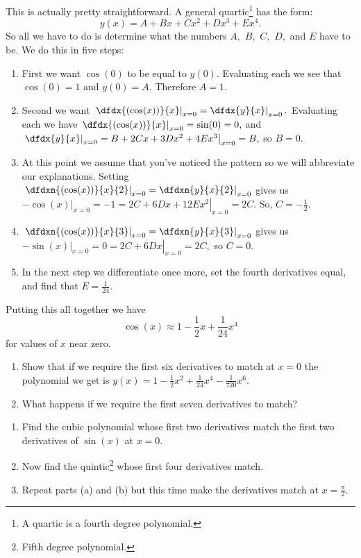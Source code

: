 \begin{Digression}
\begin{myexample}
  This is actually pretty straightforward. A general
  quartic\footnote{A quartic is a fourth degree polynomial.} has the
  form:
$$
y(x) = A+Bx+Cx^2+Dx^3+Ex^4.
$$
So all we have to do is determine what the numbers $A,$ $B,$ $C,$ $D,$
and $E$ have to be. We do this in five steps:
\begin{enumerate}
\item First we want $\cos(0)$ to be equal to $y(0).$ Evaluating each
  we see that $\cos(0)=1$ and $y(0)=A.$ Therefore $A=1.$
\item Second we want
  $\left.\left.\dfdx{(\cos(x))}{x}\right|_{x=0}=\dfdx{y}{x}\right|_{x=0}.$
  Evaluating each we have
  $\left.\dfdx{(\cos(x))}{x}\right|_{x=0}=\sin(0)=0,$ and
  $\left.\left.\dfdx{y}{x}\right|_{x=0}=B+2Cx+3Dx^2+4Ex^3\right|_{x=0}=B,$
  so $B=0.$
\item At this point we assume that you've noticed the pattern so we
  will abbreviate our explanations. Setting
  $\left.\left.\dfdxn{(\cos(x))}{x}{2}\right|_{x=0}=\dfdxn{y}{x}{2}\right|_{x=0}$
  gives us
  $\left.\left.-\cos(x)\right|_{x=0}=-1=2C+6Dx+12Ex^2\right|_{x=0}=2C.$
  So, $C=-\frac12.$
\item
  $\left.\left.\dfdxn{(\cos(x))}{x}{3}\right|_{x=0}=\dfdxn{y}{x}{3}\right|_{x=0}$
  gives us
  $\left.\left.-\sin(x)\right|_{x=0}=0=2C+6Dx\right|_{x=0}=2C,$ so
  $C=0.$
\item In the next step we differentiate once more, set the fourth
  derivatives equal, and find that $E=\frac{1}{24}.$
\end{enumerate}
Putting this all together we have
$$
\cos(x)\approx 1-\frac12x+\frac{1}{24}x^4
$$
for values of $x$ near zero.
\end{myexample}

\begin{embeddedproblem}{}
  \begin{enumerate}[label={\bf{}(\alph*)}]
  \item Show that if we require the first six derivatives to match at
    $x=0$ the polynomial we get is
    $y(x) = 1-\frac12x^2+\frac{1}{24}x^4-\frac{1}{720}x^6.$
  \item What happens if we require the first seven derivatives to
    match?
  \end{enumerate}
\end{embeddedproblem}

\begin{embeddedproblem}{}
  \begin{enumerate}[label={\bf{}(\alph*)}]
  \item Find the cubic polynomial whose first two derivatives match
    the first two derivatives of $\sin(x)$ at $x=0.$
  \item Now find the quintic\footnote{Fifth degree polynomial.} whose
    first four derivatives match.
  \item  Repeat parts (a) and (b) but this time make the derivatives
    match at $x=\frac{\pi}{2}.$
  \end{enumerate}
\end{embeddedproblem}


\end{Digression}
